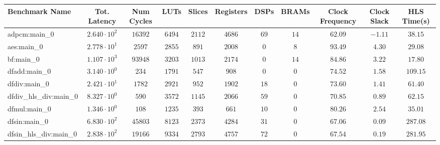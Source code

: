 \begin{tabular}{|l|c|c|c|c|c|c|c|c|c|c|}
\hline
Benchmark Name          & Tot. Latency           & Num Cycles & LUTs      & Slices    & Registers & DSPs    & BRAMs   & Clock Frequency & Clock Slack & HLS Time(s) \\
\hline
adpcm:main\_0           & $ 2.640 \cdot 10^{2} $ & $ 16392  $ & $ 6494  $ & $ 2112  $ & $ 4686  $ & $ 69  $ & $ 14  $ & $ 62.09       $ & $ -1.11   $ & $ 38.15   $ \\
aes:main\_0             & $ 2.778 \cdot 10^{1} $ & $ 2597   $ & $ 2855  $ & $ 891   $ & $ 2008  $ & $ 0   $ & $ 8   $ & $ 93.49       $ & $ 4.30    $ & $ 29.08   $ \\
bf:main\_0              & $ 1.107 \cdot 10^{3} $ & $ 93948  $ & $ 3203  $ & $ 1013  $ & $ 2174  $ & $ 0   $ & $ 14  $ & $ 84.86       $ & $ 3.22    $ & $ 17.80   $ \\
dfadd:main\_0           & $ 3.140 \cdot 10^{0} $ & $ 234    $ & $ 1791  $ & $ 547   $ & $ 908   $ & $ 0   $ & $ 0   $ & $ 74.52       $ & $ 1.58    $ & $ 109.15  $ \\
dfdiv:main\_0           & $ 2.421 \cdot 10^{1} $ & $ 1782   $ & $ 2921  $ & $ 952   $ & $ 1902  $ & $ 18  $ & $ 0   $ & $ 73.60       $ & $ 1.41    $ & $ 61.40   $ \\
dfdiv\_hls\_div:main\_0 & $ 8.327 \cdot 10^{0} $ & $ 590    $ & $ 3572  $ & $ 1145  $ & $ 2066  $ & $ 59  $ & $ 0   $ & $ 70.85       $ & $ 0.89    $ & $ 62.15   $ \\
dfmul:main\_0           & $ 1.346 \cdot 10^{0} $ & $ 108    $ & $ 1235  $ & $ 393   $ & $ 661   $ & $ 10  $ & $ 0   $ & $ 80.26       $ & $ 2.54    $ & $ 35.01   $ \\
dfsin:main\_0           & $ 6.830 \cdot 10^{2} $ & $ 45803  $ & $ 8123  $ & $ 2373  $ & $ 4284  $ & $ 31  $ & $ 0   $ & $ 67.06       $ & $ 0.09    $ & $ 287.08  $ \\
dfsin\_hls\_div:main\_0 & $ 2.838 \cdot 10^{2} $ & $ 19166  $ & $ 9334  $ & $ 2793  $ & $ 4757  $ & $ 72  $ & $ 0   $ & $ 67.54       $ & $ 0.19    $ & $ 281.95  $ \\

\end{tabular}
